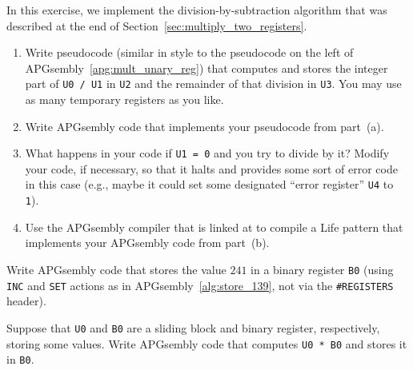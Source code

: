 \begin{multicols}{2}
	
	\mfilbreak
	
	
	\begin{problem}\label{exer:division_by_subtraction}
		In this exercise, we implement the division-by-subtraction algorithm that was described at the end of Section~\ref{sec:multiply_two_registers}.\smallskip
		
		\begin{enumerate}[label=\bf\color{ocre}(\alph*)]
			\item Write pseudocode (similar in style to the pseudocode on the left of APGsembly~\ref{apg:mult_unary_reg}) that computes and stores the integer part of \texttt{U0 / U1} in \texttt{U2} and the remainder of that division in \texttt{U3}. You may use as many temporary registers as you like.
			
			\item Write APGsembly code that implements your pseudocode from part~(a).
			
			\item What happens in your code if \texttt{U1 = 0} and you try to divide by it? Modify your code, if necessary, so that it halts and provides some sort of error code in this case (e.g., maybe it could set some designated ``error register'' \texttt{U4} to \texttt{1}).
			
			\item Use the APGsembly compiler that is linked at  to compile a Life pattern that implements your APGsembly code from part~(b).
		\end{enumerate}
	\end{problem}
	
	
	\mfilbreak
	
	
	\begin{problem}\label{exer:universal_computation_apgsembly_set_binary_value}
		Write APGsembly code that stores the value $241$ in a binary register \texttt{B0} (using \texttt{INC} and \texttt{SET} actions as in APGsembly~\ref{alg:store_139}, not via the \texttt{\#REGISTERS} header).
	\end{problem}
	
	
	\mfilbreak
	
	
	\begin{problem}\label{exer:universal_computation_apgsembly_multiply_binary}
		Suppose that \texttt{U0} and \texttt{B0} are a sliding block and binary register, respectively, storing some values. Write APGsembly code that computes \texttt{U0 * B0} and stores it in \texttt{B0}.
	\end{problem}
	

\end{multicols}
